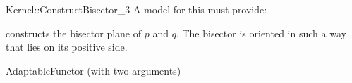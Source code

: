 \begin{ccRefFunctionObjectConcept}{Kernel::ConstructBisector_3}
A model for this must provide:


{constructs the bisector plane of $p$ and $q$.
The bisector is oriented in such a way that  lies on its
positive side. }

\ccRefines
AdaptableFunctor (with two arguments)

\end{ccRefFunctionObjectConcept}
